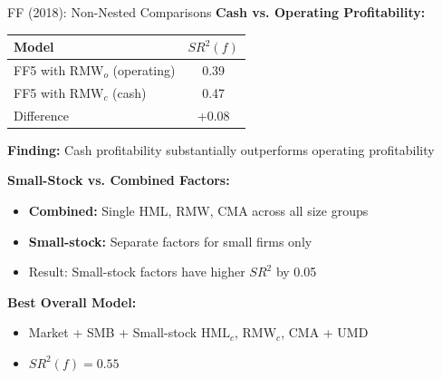 \documentclass{beamer}
\begin{document}
\begin{frame}{FF (2018): Non-Nested Comparisons}
    \textbf{Cash vs. Operating Profitability:}
    
    
    \begin{table}
        \small
        \begin{tabular}{lc}
            \toprule
            \textbf{Model} & \textbf{$SR^2(f)$} \\
            \midrule
            FF5 with $\text{RMW}_o$ (operating) & 0.39 \\
            FF5 with $\text{RMW}_c$ (cash) & 0.47 \\
            \midrule
            Difference & +0.08 \\
            \bottomrule
        \end{tabular}
    \end{table}
    
    
    \textbf{Finding:} Cash profitability substantially outperforms operating profitability
    
    \vspace{0.3cm}
    \textbf{Small-Stock vs. Combined Factors:}
    \begin{itemize}
        \item \textbf{Combined:} Single HML, RMW, CMA across all size groups
        \item \textbf{Small-stock:} Separate factors for small firms only
        \item Result: Small-stock factors have higher $SR^2$ by 0.05
    \end{itemize}
    
    
    \textbf{Best Overall Model:}
    \begin{itemize}
        \item Market + SMB + Small-stock $\text{HML}_c$, $\text{RMW}_c$, CMA + UMD
        \item $SR^2(f) = 0.55$
    \end{itemize}
\end{frame}
\end{document}

